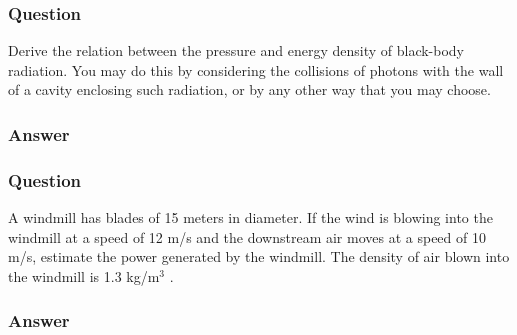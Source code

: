 \subsubsection{Question}
Derive the relation between the pressure and energy density of black-body radiation. You may do this by considering the collisions of photons with the wall of a cavity enclosing such radiation, or by any other way that you may choose.
\subsubsection{Answer}



\subsubsection{Question}
A windmill has blades of 15 meters in diameter. If the wind is blowing into the windmill at a speed of 12 m/s and the downstream air moves at a speed of 10 m/s, estimate the power generated by the windmill. The density of air blown into the windmill is 1.3 kg/m$^3$ .
\subsubsection{Answer}


